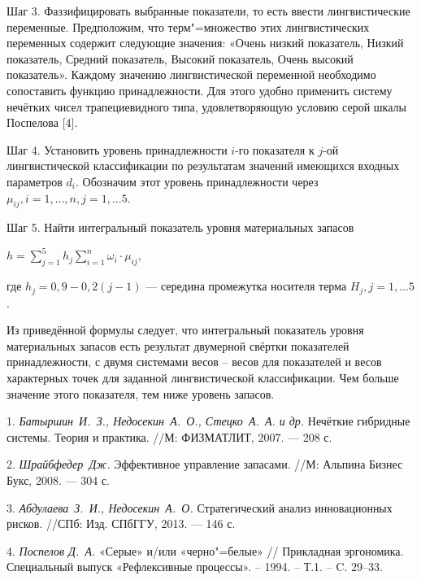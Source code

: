 Шаг 3.
Фаззифицировать выбранные показатели, то есть ввести лингвистические переменные.
Предположим, что терм"=множество этих лингвистических переменных содержит следующие значения: «Очень низкий показатель, Низкий показатель, Средний показатель, Высокий показатель, Очень высокий показатель». Каждому значению лингвистической переменной необходимо сопоставить функцию принадлежности. Для этого удобно применить систему нечётких чисел трапециевидного типа, удовлетворяющую условию серой шкалы Поспелова [4].

Шаг 4.
Установить уровень принадлежности $i$-го показателя к $j$-ой лингвистической классификации по результатам значений имеющихся входных параметров $d_{i}$. Обозначим этот уровень принадлежности через $\mu_{ij}, i = 1, \ldots, n,  j = 1, \ldots 5$.

Шаг 5.
Найти интегральный показатель уровня материальных запасов
\begin{center}
$ h = \sum_{j = 1}^{5} h_{j} \sum_{i = 1}^{n} \omega_{i} \cdot \mu_{ij},$
\end{center}
где $h_{j} = 0,9 - 0,2(j - 1)$ --- середина промежутка носителя терма $H_{j}, j = 1, \ldots 5$.

Из приведённой формулы следует, что  интегральный показатель уровня материальных запасов есть результат двумерной свёртки показателей принадлежности, с двумя системами весов – весов для показателей и весов характерных точек для заданной  лингвистической классификации. Чем больше значение этого показателя, тем ниже уровень запасов.



\litlist

1. {\it Батыршин~И.~З., Недосекин~А.~О., Стецко~А.~А. и др.} Нечёткие гибридные системы. Теория и
практика. //М: ФИЗМАТЛИТ, 2007. — 208 с.

2. {\it Шрайбфедер~Дж.} Эффективное управление запасами. //М: Альпина Бизнес Букс, 2008. — 304 с.

3. {\it Абдулаева~З.~И., Недосекин~А.~О.} Стратегический анализ инновационных рисков. //СПб: Изд. СПбГГУ, 2013. — 146 с.

4. {\it Поспелов Д.~А.} «Серые» и/или «черно"=белые» // Прикладная эргономика. Специальный выпуск  «Рефлексивные процессы». – 1994. – Т.1. – C. 29–33.
